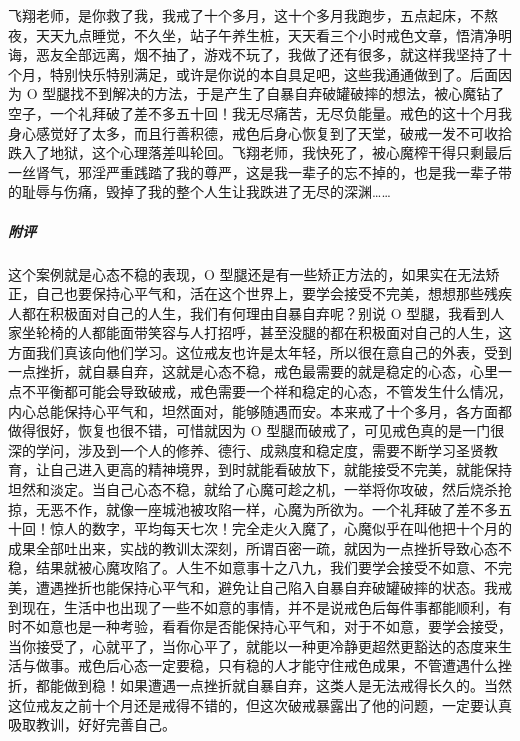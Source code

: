\begin{case}
    飞翔老师，是你救了我，我戒了十个多月，这十个多月我跑步，五点起床，不熬夜，天天九点睡觉，不久坐，站子午养生桩，天天看三个小时戒色文章，悟清净明诲，恶友全部远离，烟不抽了，游戏不玩了，我做了还有很多，就这样我坚持了十个月，特别快乐特别满足，或许是你说的本自具足吧，这些我通通做到了。后面因为 O 型腿找不到解决的方法，于是产生了自暴自弃破罐破摔的想法，被心魔钻了空子，一个礼拜破了差不多五十回！我无尽痛苦，无尽负能量。戒色的这十个月我身心感觉好了太多，而且行善积德，戒色后身心恢复到了天堂，破戒一发不可收拾跌入了地狱，这个心理落差叫轮回。飞翔老师，我快死了，被心魔榨干得只剩最后一丝肾气，邪淫严重践踏了我的尊严，这是我一辈子的忘不掉的，也是我一辈子带的耻辱与伤痛，毁掉了我的整个人生让我跌进了无尽的深渊……
    \subparagraph{附评} 这个案例就是心态不稳的表现，O 型腿还是有一些矫正方法的，如果实在无法矫正，自己也要保持心平气和，活在这个世界上，要学会接受不完美，想想那些残疾人都在积极面对自己的人生，我们有何理由自暴自弃呢？别说 O 型腿，我看到人家坐轮椅的人都能面带笑容与人打招呼，甚至没腿的都在积极面对自己的人生，这方面我们真该向他们学习。这位戒友也许是太年轻，所以很在意自己的外表，受到一点挫折，就自暴自弃，这就是心态不稳，戒色最需要的就是稳定的心态，心里一点不平衡都可能会导致破戒，戒色需要一个祥和稳定的心态，不管发生什么情况，内心总能保持心平气和，坦然面对，能够随遇而安。本来戒了十个多月，各方面都做得很好，恢复也很不错，可惜就因为 O 型腿而破戒了，可见戒色真的是一门很深的学问，涉及到一个人的修养、德行、成熟度和稳定度，需要不断学习圣贤教育，让自己进入更高的精神境界，到时就能看破放下，就能接受不完美，就能保持坦然和淡定。当自己心态不稳，就给了心魔可趁之机，一举将你攻破，然后烧杀抢掠，无恶不作，就像一座城池被攻陷一样，心魔为所欲为。一个礼拜破了差不多五十回！惊人的数字，平均每天七次！完全走火入魔了，心魔似乎在叫他把十个月的成果全部吐出来，实战的教训太深刻，所谓百密一疏，就因为一点挫折导致心态不稳，结果就被心魔攻陷了。人生不如意事十之八九，我们要学会接受不如意、不完美，遭遇挫折也能保持心平气和，避免让自己陷入自暴自弃破罐破摔的状态。我戒到现在，生活中也出现了一些不如意的事情，并不是说戒色后每件事都能顺利，有时不如意也是一种考验，看看你是否能保持心平气和，对于不如意，要学会接受，当你接受了，心就平了，当你心平了，就能以一种更冷静更超然更豁达的态度来生活与做事。戒色后心态一定要稳，只有稳的人才能守住戒色成果，不管遭遇什么挫折，都能做到稳！如果遭遇一点挫折就自暴自弃，这类人是无法戒得长久的。当然这位戒友之前十个月还是戒得不错的，但这次破戒暴露出了他的问题，一定要认真吸取教训，好好完善自己。
\end{case}

